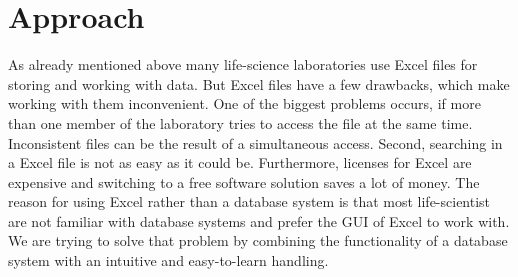 \documentclass{bioinfo}
\begin{document}
\section{Approach}

As already mentioned above many life-science laboratories use Excel files for storing and working with 
data. But Excel files have a few drawbacks, which make working with them inconvenient. One of the 
biggest problems occurs, if more than one member of the laboratory tries to access the file at the 
same time. Inconsistent files can be the result of a simultaneous access. Second, searching in a Excel file is not as easy as 
it could be. Furthermore, licenses for Excel are expensive and switching to a free software solution 
saves a lot of money. The reason for using Excel rather than a database system is that most life-scientist 
are not familiar with database systems and prefer the GUI of Excel to work with. We are 
trying to solve that problem by combining the functionality of a database system with an intuitive and 
easy-to-learn handling.
\end{document}
